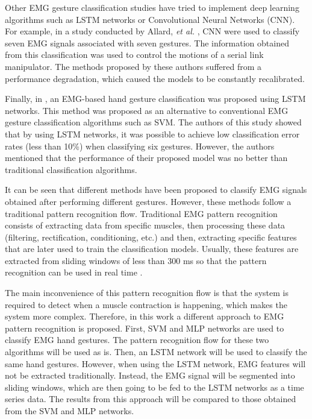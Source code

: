 \documentclass[journal]{IEEEtran}
\newcommand{\etal}{\emph{et al.}}
\begin{document}
Other EMG gesture classification studies have tried to implement deep learning algorithms such as LSTM networks or Convolutional Neural Networks (CNN). For example, in a study conducted by Allard, \etal{} \cite{allard2016}, CNN were used to classify seven EMG signals associated with seven gestures. The information obtained from this classification was used to control the motions of a serial link manipulator. The methods proposed by these authors suffered from a performance degradation, which caused the models to be constantly recalibrated. 

Finally, in \cite{jabbari2020}, an EMG-based hand gesture classification was proposed using LSTM networks. This method was proposed as an alternative to conventional EMG gesture classification algorithms such as SVM. The authors of this study showed that by using LSTM networks, it was possible to achieve low classification error rates (less than 10\%) when classifying six gestures. However, the authors mentioned that the performance of their proposed model was no better than traditional classification algorithms.

It can be seen that different methods have been proposed to classify EMG signals obtained after performing different gestures. However, these methods follow a traditional pattern recognition flow. Traditional EMG pattern recognition consists of extracting data from specific muscles, then processing these data (filtering, rectification, conditioning, etc.) and then, extracting specific features that are later used to train the classification models. Usually, these features are extracted from sliding windows of less than 300 ms so that the pattern recognition can be used in real time \cite{englehart2003}. 

The main inconvenience of this pattern recognition flow is that the system is required to detect when a muscle contraction is happening, which makes the system more complex. Therefore, in this work a different approach to EMG pattern recognition is proposed. First, SVM and MLP networks are used to classify EMG hand gestures. The pattern recognition flow for these two algorithms will be used as is. Then, an LSTM network will be used to classify the same hand gestures. However, when using the LSTM network, EMG features will not be extracted traditionally. Instead, the EMG signal will be segmented into sliding windows, which are then going to be fed to the LSTM networks as a time series data. The results from this approach will be compared to those obtained from the SVM and MLP networks.
\end{document}
